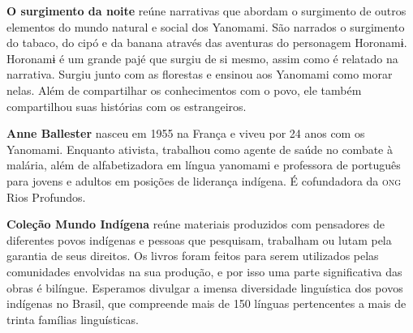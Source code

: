 \textbf{O surgimento da noite} reúne narrativas que abordam o surgimento de outros elementos do mundo natural e social dos Yanomami. São narrados o surgimento do tabaco, do cipó e da banana através das aventuras do personagem Horonamɨ. Horonamɨ é um grande pajé que surgiu de si mesmo, assim como é relatado na narrativa. Surgiu junto com as florestas e ensinou aos Yanomami como morar nelas. Além de compartilhar os conhecimentos com o povo, ele também compartilhou suas histórias com os estrangeiros.

\textbf{Anne Ballester} nasceu em 1955 na França e viveu por 24 anos com os Yanomami. Enquanto ativista, trabalhou como agente de saúde no combate à malária, além de alfabetizadora em língua yanomami e professora de português para jovens e adultos em posições de liderança indígena. É cofundadora da \textsc{ong} Rios Profundos. 

\textbf{Coleção Mundo Indígena} reúne materiais produzidos com pensadores de diferentes povos indígenas e pessoas que pesquisam, trabalham ou lutam pela garantia de seus direitos. Os livros foram feitos para serem utilizados pelas comunidades envolvidas na sua produção, e por isso uma parte significativa das obras é bilíngue. Esperamos divulgar a imensa diversidade linguística dos povos indígenas no Brasil, que compreende mais de 150 línguas pertencentes a mais de trinta famílias linguísticas.



